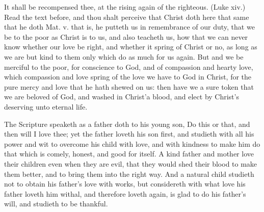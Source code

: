 It shall be recompensed thee, at the rising again of 
the righteous. (Luke xiv.) Read the text before, and 
thou shalt perceive that Christ doth here that same that he 
doth Mat. v. that is, he putteth us in remembrance of our 
duty, that we be to the poor as Christ is to us, and also 
teacheth us, how that we can never know whether our 
love be right, and whether it spring of Christ or no, as long 
as we are but kind to them only which do as much for us 
again. But and we be merciful to the poor, for conscience 
to God, and of compassion and hearty love, which compassion
and love spring of the love we have to God in 
Christ, for the pure mercy and love that he hath shewed 
on us: then have we a sure token that we are beloved of 
God, and washed in Christ'a blood, and elect by Christ's 
deserving unto eternal life. 

The Scripture speaketh as a father doth to his young 
son, Do this or that, and then will I love thee; yet the 
father loveth his son first, and studieth with all his power 
and wit to overcome his child with love, and with kindness 
to make him do that which is comely, honest, and good for 
itself. A kind father and mother love their children even 
when they are evil, that they would shed their blood to 
make them better, and to bring them into the right way. 
And a natural child studieth not to obtain his father's love 
with works, but considereth with what love his father 
loveth him withal, and therefore loveth again, is glad to do 
his father's will, and studieth to be thankful. 

